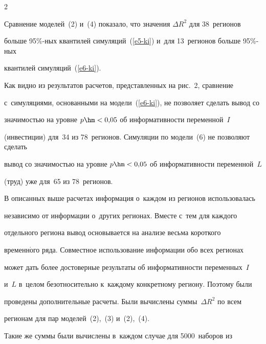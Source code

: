 \begin{multicols}{2}


   


  Сравнение моделей~(2) и~(4) показало, что значения $\Delta R^2$ для 38~регионов 


больше 95\%-ных квантилей симуляций~(\ref{e5-ki}) и~для 13~регионов больше 95\%-ных 


квантилей симуляций~(\ref{e6-ki}).

















 Как видно из результатов расчетов, пред\-став\-лен\-ных на рис.~2, сравнение 


с~симуляциями, основанными на модели~(\ref{e6-ki}), не позволяет сделать вывод со 


значимостью на уровне $p\hm< 0{,}05$ об информативности переменной~$I$ 


(инвестиции) для~34 из 78~регионов. Симуляции по модели~(6) не позволяют сделать 


вывод со значимостью на уровне $p\hm< 0{,}05$ об информативности переменной~$L$ 


(труд) уже для~65 из 78~регионов.


  


  В описанных выше расчетах информация о~каж\-дом из регионов использовалась 


независимо от информации о~других регионах. Вместе с~тем для каждого 


отдельного региона вывод основывается на анализе весьма короткого 


временн$\acute{\mbox{о}}$го ряда. Совместное использование информации обо всех регионах 


может дать более достоверные результаты об информативности переменных~$I$ 


и~$L$ в~целом безотносительно к~каждому конкретному региону. Поэтому были 


проведены дополнительные расчеты. Были вычислены суммы~$\Delta R^2$ по всем 


регионам для пар моделей~(2),~(3) и~(2),~(4). 


Такие же суммы были вычислены в~каждом случае для 5000~наборов из 



\end{multicols}
